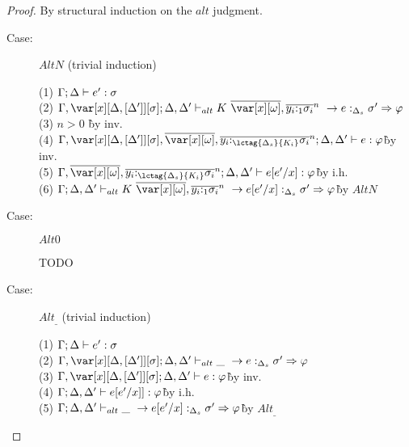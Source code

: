 \begin{proof}
By structural induction on the $alt$ judgment.

\begin{description}
\item[Case:] $AltN$ (trivial induction)
\begin{tabbing}
  (1) $\Gamma; \Delta \vdash e' : \sigma$\\
  (2) $\G,\xD; \D,\D' \vdash_{alt} \konstructor~\to e :_{\D_s} \s' \Rightarrow \vp$\\
  (3) $n > 0$ \` by inv.\\
  (4) $\G,\xD,\ov{\xo},\ov{y_i{:}_{\lctag{\D_s}{K_i}}\s_i}^n; \D, \D' \vdash e : \vp$\` by inv.\\
  (5) $\G,\ov{\xo},\ov{y_i{:}_{\lctag{\D_s}{K_i}}\s_i}^n; \D, \D' \vdash e[e'/x] : \vp$\` by i.h.\\
  (6) $\G; \D,\D' \vdash_{alt} \konstructor~\to e[e'/x] :_{\D_s} \s' \Rightarrow \vp$\` by $AltN$\\
\end{tabbing}

\item[Case:] $Alt0$
\begin{tabbing}
    TODO
\end{tabbing}

\item[Case:] $Alt_\_$ (trivial induction)
\begin{tabbing}
    (1) $\Gamma;\Delta \vdash e' : \sigma$\\
    (2) $\G,\xD; \D,\D' \vdash_{alt} \_~\to e :_{\D_s} \s' \Rightarrow \vp$\\
    (3) $\G,\xD; \D,\D' \vdash e : \vp$\` by inv.\\
    (4) $\Gamma; \Delta, \Delta' \vdash e[e'/x]] : \varphi$\` by i.h.\\
    (5) $\Gamma; \Delta,\Delta' \vdash_{alt} \_~\to e[e'/x] :_{\Delta_s} \sigma' \Rightarrow \varphi$\` by $Alt_\_$\\
\end{tabbing}
\end{description}

\end{proof}

